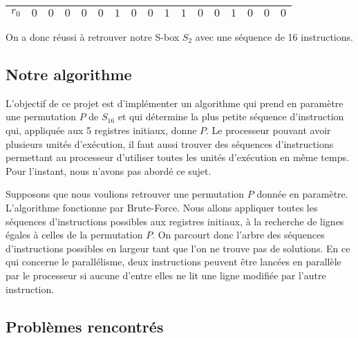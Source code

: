 \documentclass{article}
\begin{document}
\begin{center}
\begin{tabular}{|l|l|l|l|l|l|l|l|l|l|l|l|l|l|l|l|l|}
\hline
\multicolumn{1}{|l|}{ $r_{0}$}&	\multicolumn{1}{|l|}{ $0$}&	\multicolumn{1}{|l|}{ $0$}&	\multicolumn{1}{|l|}{ $0$}&	\multicolumn{1}{|l|}{ $0$}&	\multicolumn{1}{|l|}{ $0$}&	\multicolumn{1}{|l|}{ $1$}&	\multicolumn{1}{|l|}{ $0$}&	\multicolumn{1}{|l|}{ $0$}&	\multicolumn{1}{|l|}{ $1$}&	\multicolumn{1}{|l|}{ $1$}&	\multicolumn{1}{|l|}{ $0$}&	\multicolumn{1}{|l|}{ $0$}&	\multicolumn{1}{|l|}{ $1$}&	\multicolumn{1}{|l|}{ $0$}&	\multicolumn{1}{|l|}{ $0$}&	\multicolumn{1}{|l|}{ $0$}	\\
\hline
\end{tabular}

\end{center}
\medbreak
On a donc réussi à retrouver notre S-box $S_{2}$ avec une séquence de 16 instructions. 

\subsection{Notre algorithme}

L'objectif de ce projet est d'implémenter un algorithme qui prend en paramètre une permutation $P$ de $S_{16}$ et qui détermine la plus petite séquence d'instruction qui, appliquée aux 5 registres initiaux, donne $P$. Le processeur pouvant avoir plusieurs unités d'exécution, il faut aussi trouver des séquences d'instructions permettant au processeur d'utiliser toutes les unités d'exécution en même temps. Pour l'instant, nous n'avons pas abordé ce sujet.
       
Supposons que nous voulions retrouver une permutation $P$ donnée en paramètre. L'algorithme fonctionne par Brute-Force. Nous allons appliquer toutes les séquences d'instructions possibles aux registres initiaux, à la recherche de lignes égales à celles de la permutation $P$. On parcourt donc l'arbre des séquences d'instructions possibles en largeur tant que l'on ne trouve pas de solutions. En ce qui concerne le parallélisme, deux instructions peuvent être lancées en parallèle par le processeur si aucune d'entre elles ne lit une ligne modifiée par l'autre instruction.

\subsection{Problèmes rencontrés}
\end{document}
